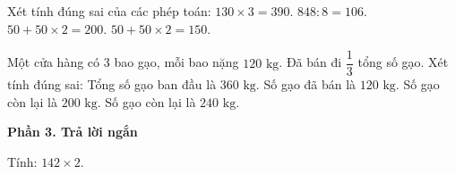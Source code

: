 \begin{ex} %
Xét tính đúng sai của các phép toán:
\choiceTF
{\True $130 \times 3 = 390$.}
{\True $848 : 8 = 106$.}
{$50 + 50 \times 2 = 200$.}
{\True $50 + 50 \times 2 = 150$.}
\end{ex}

\begin{ex} %
Một cửa hàng có 3 bao gạo, mỗi bao nặng $120\text{ kg}$. Đã bán đi $\dfrac{1}{3}$ tổng số gạo. Xét tính đúng sai:
\choiceTF
{\True Tổng số gạo ban đầu là $360\text{ kg}$.}
{\True Số gạo đã bán là $120\text{ kg}$.}
{Số gạo còn lại là $200\text{ kg}$.}
{\True Số gạo còn lại là $240\text{ kg}$.}
\end{ex}

\textbf{Phần 3. Trả lời ngắn}

\begin{ex} %
Tính: $142 \times 2$.
\end{ex}

